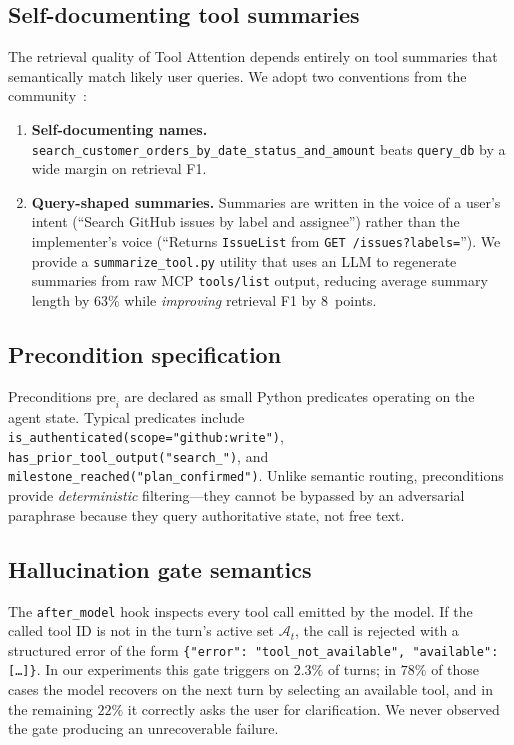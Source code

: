 \documentclass[11pt]{article}
\begin{document}
\subsection{Self-documenting tool summaries}

The retrieval quality of Tool Attention depends entirely on tool summaries that semantically match likely user queries. We adopt two conventions from the community~\citep{pan2026agent}:
\begin{enumerate}
\item \textbf{Self-documenting names.} \texttt{search\_customer\_orders\_by\_date\_status\_and\_amount} beats \texttt{query\_db} by a wide margin on retrieval F1.
\item \textbf{Query-shaped summaries.} Summaries are written in the voice of a user's intent (``Search GitHub issues by label and assignee'') rather than the implementer's voice (``Returns \texttt{IssueList} from \texttt{GET /issues?labels=}''). We provide a \texttt{summarize\_tool.py} utility that uses an LLM to regenerate summaries from raw MCP \texttt{tools/list} output, reducing average summary length by $63\%$ while \emph{improving} retrieval F1 by $8$~points.
\end{enumerate}

\subsection{Precondition specification}

Preconditions $\text{pre}_i$ are declared as small Python predicates operating on the agent state. Typical predicates include \texttt{is\_authenticated(scope="github:write")}, \texttt{has\_prior\_tool\_output("search\_")}, and \texttt{milestone\_reached("plan\_confirmed")}. Unlike semantic routing, preconditions provide \emph{deterministic} filtering---they cannot be bypassed by an adversarial paraphrase because they query authoritative state, not free text.

\subsection{Hallucination gate semantics}

The \texttt{after\_model} hook inspects every tool call emitted by the model. If the called tool ID is not in the turn's active set $\mathcal{A}_t$, the call is rejected with a structured error of the form \texttt{\{"error": "tool\_not\_available", "available": [\ldots]\}}. In our experiments this gate triggers on $2.3\%$ of turns; in $78\%$ of those cases the model recovers on the next turn by selecting an available tool, and in the remaining $22\%$ it correctly asks the user for clarification. We never observed the gate producing an unrecoverable failure.
\end{document}
